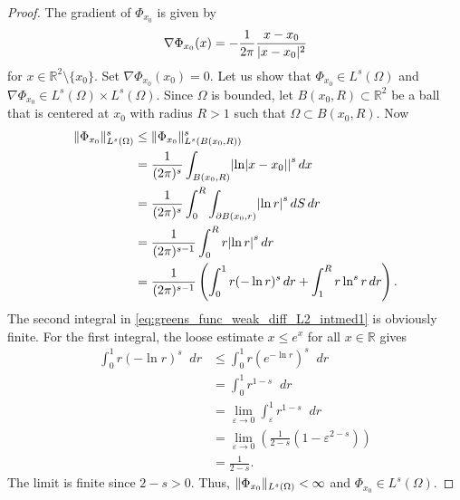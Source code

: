 \documentclass[english, 12pt, a4paper, sci, utf8, a-2b, online]{aaltothesis}
\theoremstyle{definition}
\theoremstyle{plain}
\DeclarePairedDelimiter\abs{\lvert}{\rvert}
\DeclarePairedDelimiter\norm{\lVert}{\rVert}
\newcommand*\diff{\mathop{}\!d}
\numberwithin{equation}{section}
\begin{document}
\begin{proof}
    The gradient of $\Phi_{x_0}$ is given by
    \begin{equation*}
        \nabla \Phi_{x_0}(x) = -\frac{1}{2\pi} \frac{x-x_0}{\abs{x-x_0}^2}
    \end{equation*}
    for $x \in \mathbb{R}^2 \setminus \{ x_0 \}$.
    Set $\nabla \Phi_{x_0}(x_0) = 0$.
    Let us show that $\Phi_{x_0} \in L^s(\Omega)$ and
    $\nabla \Phi_{x_0} \in L^s(\Omega) \times L^s(\Omega)$.
    Since $\Omega$ is bounded, let $B(x_0,R) \subset \mathbb{R}^2$
    be a ball that is centered at $x_0$ with radius $R > 1$
    such that $\Omega \subset B(x_0,R)$. Now
    \begin{align}
        \norm{\Phi_{x_0}}_{L^s(\Omega)}^s
        &\leq \norm{\Phi_{x_0}}_{L^s(B(x_0,R))}^s \nonumber \\
        &= \frac{1}{(2\pi)^s} \int_{B(x_0,R)} \abs*{\ln\abs{x-x_0}}^s \diff x \nonumber \\
        &= \frac{1}{(2\pi)^s} \int_{0}^{R} \int_{\partial B(x_0,r)}
            \abs*{\ln r}^s \diff S \diff r \nonumber \\
        &= \frac{1}{(2\pi)^{s-1}} \int_{0}^{R} r \abs*{\ln r}^s \diff r \nonumber \\
        \label{eq:greens_func_weak_diff_L2_intmed1}
        &= \frac{1}{(2\pi)^{s-1}} \left(
            \int_{0}^{1} r (-\ln r)^s \diff r
                + \int_{1}^{R} r \ln^s r \diff r
                \right).
    \end{align}
    The second integral in \eqref{eq:greens_func_weak_diff_L2_intmed1} is obviously finite.
    For the first integral, the loose estimate $x \leq e^x$
    for all $x \in \mathbb{R}$ gives
    \begin{align*}
        \int_{0}^{1} r (-\ln r)^s \diff r
        &\leq \int_{0}^{1} r \left(e^{-\ln r} \right)^s \diff r \\
        &= \int_{0}^{1} r^{1-s} \diff r \\
        &= \lim_{\varepsilon \to 0} \int_{\varepsilon}^{1} r^{1-s} \diff r \\
        &= \lim_{\varepsilon \to 0} \left(
            \frac{1}{2-s} \left( 1 - \varepsilon^{2-s} \right)
                \right) \\
        &= \frac{1}{2-s}.
    \end{align*}
    The limit is finite since $2-s > 0$. Thus,
    $\norm{\Phi_{x_0}}_{L^s(\Omega)} < \infty$ and $\Phi_{x_0} \in L^s(\Omega)$.


\end{proof}
\end{document}
